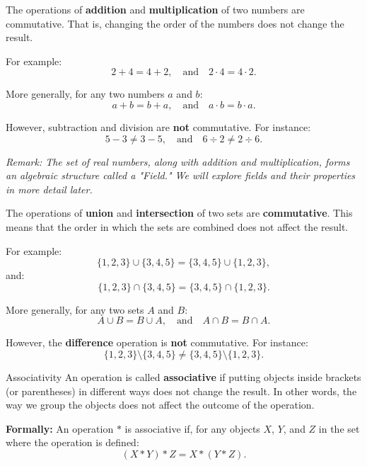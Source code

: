 \begin{example}
    The operations of \textbf{addition} and \textbf{multiplication} of two numbers are commutative. That is, changing the order of the numbers does not change the result.
    
    For example:
    \[
    2 + 4 = 4 + 2, \quad \text{and} \quad 2 \cdot 4 = 4 \cdot 2.
    \]
    
    More generally, for any two numbers \( a \) and \( b \):
    \[
    a + b = b + a, \quad \text{and} \quad a \cdot b = b \cdot a.
    \]
    
    However, subtraction and division are \textbf{not} commutative. For instance:
    \[
    5 - 3 \neq 3 - 5, \quad \text{and} \quad 6 \div 2 \neq 2 \div 6.
    \]

    \textit{Remark: The set of real numbers, along with addition and multiplication, forms an algebraic structure called a "Field." We will explore fields and their properties in more detail later.}
\end{example}

\begin{example}
    The operations of \textbf{union} and \textbf{intersection} of two sets are \textbf{commutative}. This means that the order in which the sets are combined does not affect the result.
    
    For example:
    \[
    \{1, 2, 3\} \cup \{3, 4, 5\} = \{3, 4, 5\} \cup \{1, 2, 3\},
    \]
    and:
    \[
    \{1, 2, 3\} \cap \{3, 4, 5\} = \{3, 4, 5\} \cap \{1, 2, 3\}.
    \]
    
    More generally, for any two sets \( A \) and \( B \):
    \[
    A \cup B = B \cup A, \quad \text{and} \quad A \cap B = B \cap A.
    \]
    
    However, the \textbf{difference} operation is \textbf{not} commutative. For instance:
    \[
    \{1, 2, 3\} \setminus \{3, 4, 5\} \neq \{3, 4, 5\} \setminus \{1, 2, 3\}.
    \]
\end{example}

\begin{definitionbox}{Associativity}
    An operation is called \textbf{associative} if putting objects inside brackets (or parentheses) in different ways does not change the result. In other words, the way we group the objects does not affect the outcome of the operation.
    
    \textbf{Formally:}  
    An operation \( * \) is associative if, for any objects \( X \), \( Y \), and \( Z \) in the set where the operation is defined:
    \[
    (X * Y) * Z = X * (Y * Z).
    \]
\end{definitionbox}

